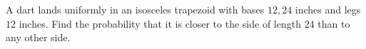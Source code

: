 A dart lands uniformly in an isosceles trapezoid with bases $12,24$ inches and legs $12$ inches. Find the probability that it is closer to the side of length $24$ than to any other side.
